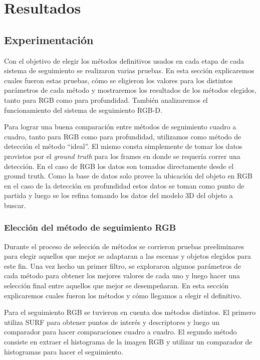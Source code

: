 \chapter{Resultados}
\section{Experimentación}
Con el objetivo de elegir los métodos definitivos usados en cada etapa de cada sistema de seguimiento se realizaron varias pruebas. En esta sección explicaremos cuales fueron estas pruebas, cómo se eligieron los valores para los distintos parámetros de cada método y mostraremos los resultados de los métodos elegidos, tanto para RGB como para profundidad. También analizaremos el funcionamiento del sistema de seguimiento RGB-D.

Para lograr una buena comparación entre métodos de seguimiento cuadro a cuadro, tanto para RGB como para profundidad, utilizamos como método de detección el método ``ideal''. El mismo consta simplemente de tomar los datos provistos por el \textit{ground truth} para los frames en donde se requería correr una detección. En el caso de RGB los datos son tomados directamente desde el ground truth. Como la base de datos solo provee la ubicación del objeto en RGB en el caso de la detección en profundidad estos datos se toman como punto de partida y luego se los refina tomando los datos del modelo 3D del objeto a buscar.

\subsection{Elección del método de seguimiento RGB}
Durante el proceso de selección de métodos se corrieron pruebas preeliminares para elegir aquellos que mejor se adaptaran a las escenas y objetos elegidos para este fin. Una vez hecho un primer filtro, se exploraron algunos parámetros de cada método para obtener los mejores valores de cada uno y luego hacer una selección final entre aquellos que mejor se desempeñaran. En esta sección explicaremos cuales fueron los métodos y cómo llegamos a elegir el definitivo.

Para el seguimiento RGB se tuvieron en cuenta dos métodos distintos. El primero utiliza SURF \cite{surf} para obtener puntos de interés y descriptores y luego un comparador para hacer comparaciones cuadro a cuadro. El segundo método consiste en extraer el histograma de la imagen RGB y utilizar un comparador de histogramas para hacer el seguimiento.

